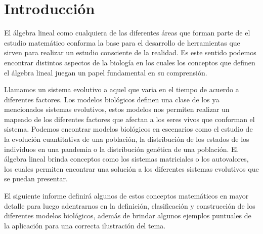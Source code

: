 \section{Introducción} %
\label{sec:Introducción}

El álgebra lineal como cualquiera de las diferentes áreas que forman parte de el estudio matemático conforma la base para el desarrollo de herramientas que sirven para realizar un estudio consciente de la realidad. Es este sentido podemos encontrar distintos aspectos de la biología en los cuales los conceptos que definen el álgebra lineal juegan un papel fundamental en su comprensión.

Llamamos un sistema evolutivo a aquel que varia en el tiempo de acuerdo a diferentes factores. Los modelos biológicos definen una clase de los ya mencionados sistemas evolutivos, estos modelos nos permiten realizar un mapeado de los diferentes factores que afectan a los seres vivos que conforman el sistema. Podemos encontrar modelos biológicos en escenarios como el estudio de la evolución cuantitativa de una población, la distribución de los estados de los individuos en una pandemia o la distribución genética de una población. El álgebra lineal brinda conceptos como los sistemas matriciales o los autovalores, los cuales permiten encontrar una solución a los diferentes sistemas evolutivos que se puedan presentar. 

El siguiente informe definirá algunos de estos conceptos matemáticos en mayor detalle para luego adentrarnos en la definición, clasificación y construcción de los diferentes modelos biológicos, además de brindar algunos ejemplos puntuales de la aplicación para una correcta ilustración del tema.

